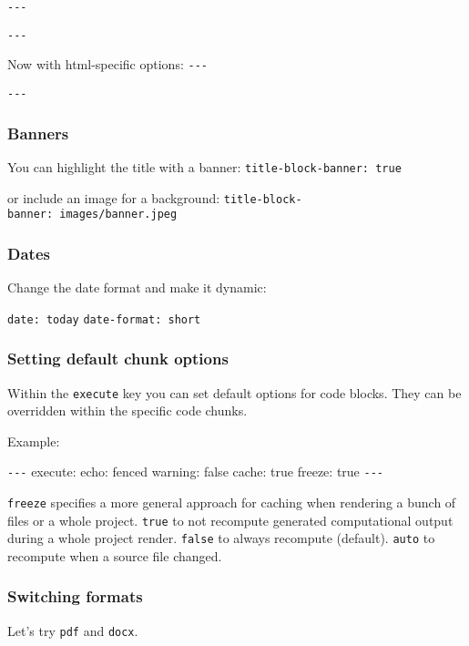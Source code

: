 \documentclass[
  letterpaper,
  DIV=11,
  numbers=noendperiod]{scrartcl}
\begin{document}
\texttt{-\/-\/-}

\texttt{-\/-\/-}

Now with html-specific options: \texttt{-\/-\/-}

\texttt{-\/-\/-}

\hypertarget{banners}{%
\subsubsection{Banners}\label{banners}}

You can highlight the title with a banner:
\texttt{title-block-banner:\ true}

or include an image for a background:
\texttt{title-block-banner:\ images/banner.jpeg}

\hypertarget{dates}{%
\subsubsection{Dates}\label{dates}}

Change the date format and make it dynamic:

\texttt{date:\ today} \texttt{date-format:\ short}

\hypertarget{setting-default-chunk-options}{%
\subsubsection{Setting default chunk
options}\label{setting-default-chunk-options}}

Within the \texttt{execute} key you can set default options for code
blocks. They can be overridden within the specific code chunks.

Example:

\texttt{-\/-\/-} execute: echo: fenced warning: false cache: true
freeze: true \texttt{-\/-\/-}

\texttt{freeze} specifies a more general approach for caching when
rendering a bunch of files or a whole project. \texttt{true} to not
recompute generated computational output during a whole project render.
\texttt{false} to always recompute (default). \texttt{auto} to recompute
when a source file changed.

\hypertarget{switching-formats}{%
\subsubsection{Switching formats}\label{switching-formats}}

Let's try \texttt{pdf} and \texttt{docx}.
\end{document}
